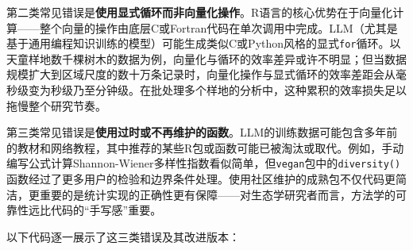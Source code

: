 \documentclass[
  twoside,12pt,fontset=none]{ctexbook}
\begin{document}
第二类常见错误是\textbf{使用显式循环而非向量化操作}。R语言的核心优势在于向量化计算------整个向量的操作由底层C或Fortran代码在单次调用中完成。LLM（尤其是基于通用编程知识训练的模型）可能生成类似C或Python风格的显式\texttt{for}循环。以天童样地数千棵树木的数据为例，向量化与循环的效率差异或许不明显；但当数据规模扩大到区域尺度的数十万条记录时，向量化操作与显式循环的效率差距会从毫秒级变为秒级乃至分钟级。在批处理多个样地的分析中，这种累积的效率损失足以拖慢整个研究节奏。

第三类常见错误是\textbf{使用过时或不再维护的函数}。LLM的训练数据可能包含多年前的教材和网络教程，其中推荐的某些R包或函数可能已被淘汰或取代。例如，手动编写公式计算Shannon-Wiener多样性指数看似简单，但\texttt{vegan}包中的\texttt{diversity()}函数经过了更多用户的检验和边界条件处理。使用社区维护的成熟包不仅代码更简洁，更重要的是统计实现的正确性更有保障------对生态学研究者而言，方法学的可靠性远比代码的``手写感''重要。

以下代码逐一展示了这三类错误及其改进版本：
\end{document}
